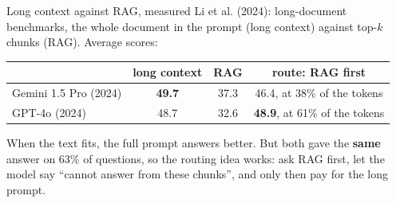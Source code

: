 \begin{frame}{Long context against RAG, measured}
  \vspace{0.2em}
  {\small Li et al. (2024): long-document benchmarks, the whole document in the prompt (long
  context) against top-$k$ chunks (RAG). Average scores:}

  \vspace{0.2em}
  \begin{center}
  \small
  \begin{tabular}{lccc}
    \toprule
    & \textbf{long context} & \textbf{RAG} & \textbf{route: RAG first} \\
    \midrule
    Gemini 1.5 Pro (2024) & \textbf{49.7} & 37.3 & 46.4, at 38\% of the tokens \\
    GPT-4o (2024)         & 48.7 & 32.6 & \textbf{48.9}, at 61\% of the tokens \\
    \bottomrule
  \end{tabular}
  \end{center}

  \vspace{0.2em}
  {\small When the text fits, the full prompt answers better. But both gave the \textbf{same}
  answer on 63\% of questions, so the routing idea works: ask RAG first, let the model say
  ``cannot answer from these chunks'', and only then pay for the long prompt.}

  \vspace{0.2em}
\end{frame}

